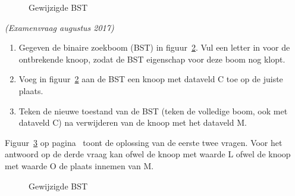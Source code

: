 \begin{oef}
\begin{opl}
\begin{figure}[htbp]
\caption{Gewijzigde BST}
    \label{fig:bstex1opl}
\end{figure}
\end{opl}
\end{oef}







\begin{oef}
\papier \emph{(Examenvraag augustus 2017)}\\
\begin{enumerate}
\item Gegeven de binaire zoekboom (BST) in figuur~\ref{fig:bstex2}. Vul een letter in voor de ontbrekende knoop, zodat de BST eigenschap voor deze boom nog klopt.
\begin{figure}[htbp]
    \centering
{}
\caption{}
    \label{fig:bstex2}
\end{figure}
\item Voeg in figuur~\ref{fig:bstex2} aan de BST een knoop met dataveld C toe op de juiste plaats.
\item Teken de nieuwe toestand van de BST (teken de volledige boom, ook met dataveld C) na verwijderen van de knoop met het dataveld M.

\end{enumerate}

\begin{opl}
Figuur~\ref{fig:bstex2opl} op pagina~\pageref{fig:bstex2opl} toont de oplossing van de eerste twee vragen. Voor het antwoord op de derde vraag kan ofwel de knoop met waarde L ofwel de knoop met waarde O de plaats innemen van M.
\begin{figure}[htbp]
    \centering
{}
\caption{Gewijzigde BST}
    \label{fig:bstex2opl}
\end{figure}
\end{opl}
\end{oef}


